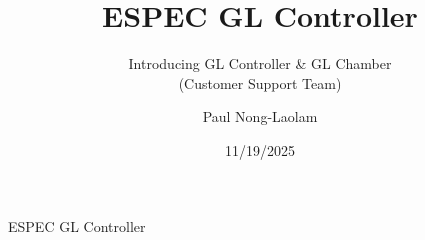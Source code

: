 \documentclass{beamer}
\title{ESPEC GL Controller}
\subtitle{Introducing GL Controller \& GL Chamber\\ (Customer Support Team)}
\author{Paul Nong-Laolam}%
\institute[Company and Affiliation] %
{
  ESPEC North America, Inc. \\ 
  4141 Central Parkway \\
  Hudsonville, Michigan 49426 (USA) 
  }
\date{11/19/2025}
\begin{document}
\begin{frame}
  \titlepage
\end{frame}

\begin{frame}{ESPEC GL Controller}
  \tableofcontents
\end{frame}
%




\end{document}
